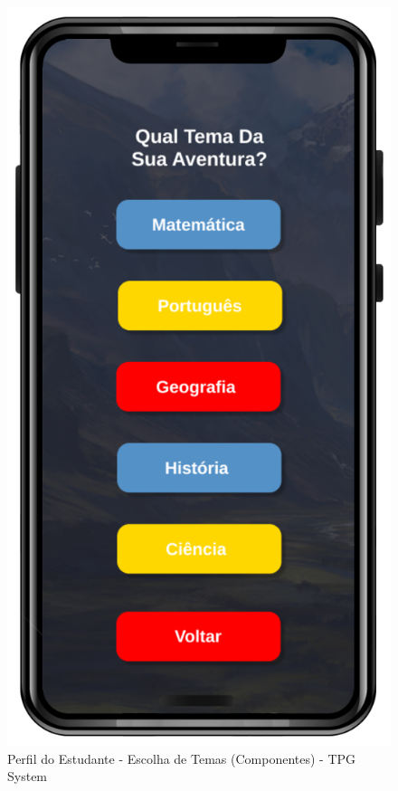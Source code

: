 \begin{figure}[!h]
\centering
\caption{Perfil do Estudante - Escolha de Temas (Componentes) - TPG System}%
\label{fig:Tela11}
\includegraphics[scale=0.20]{Illustrations/Tela11.png}
\end{figure}

